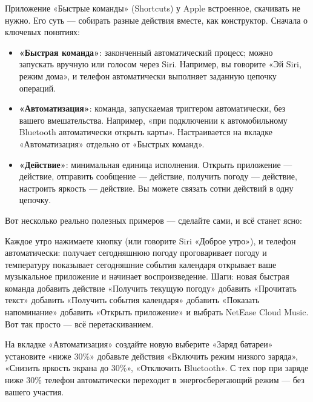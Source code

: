 
Приложение «Быстрые команды» (Shortcuts) у Apple встроенное, скачивать не нужно. Его суть — собирать разные действия вместе, как конструктор. Сначала о ключевых понятиях:

\begin{itemize}
  \item \textbf{«Быстрая команда»}: законченный автоматический процесс; можно запускать вручную или голосом через Siri. Например, вы говорите «Эй Siri, режим дома», и телефон автоматически выполняет заданную цепочку операций.
  \item \textbf{«Автоматизация»}: команда, запускаемая триггером автоматически, без вашего вмешательства. Например, «при подключении к автомобильному Bluetooth автоматически открыть карты». Настраивается на вкладке «Автоматизация» отдельно от «Быстрых команд».
  \item \textbf{«Действие»}: минимальная единица исполнения. Открыть приложение — действие, отправить сообщение — действие, получить погоду — действие, настроить яркость — действие. Вы можете связать сотни действий в одну цепочку.
\end{itemize}

Вот несколько реально полезных примеров — сделайте сами, и всё станет ясно:


Каждое утро нажимаете кнопку (или говорите Siri «Доброе утро»), и телефон автоматически: получает сегодняшнюю погоду проговаривает погоду и температуру показывает сегодняшние события календаря открывает ваше музыкальное приложение и начинает воспроизведение. Шаги: новая быстрая команда добавить действие «Получить текущую погоду» добавить «Прочитать текст» добавить «Получить события календаря» добавить «Показать напоминание» добавить «Открыть приложение» и выбрать NetEase Cloud Music. Вот так просто — всё перетаскиванием.


На вкладке «Автоматизация» создайте новую выберите «Заряд батареи» установите «ниже 30\%» добавьте действия «Включить режим низкого заряда», «Снизить яркость экрана до 30\%», «Отключить Bluetooth». С тех пор при заряде ниже 30\% телефон автоматически переходит в энергосберегающий режим — без вашего участия.


